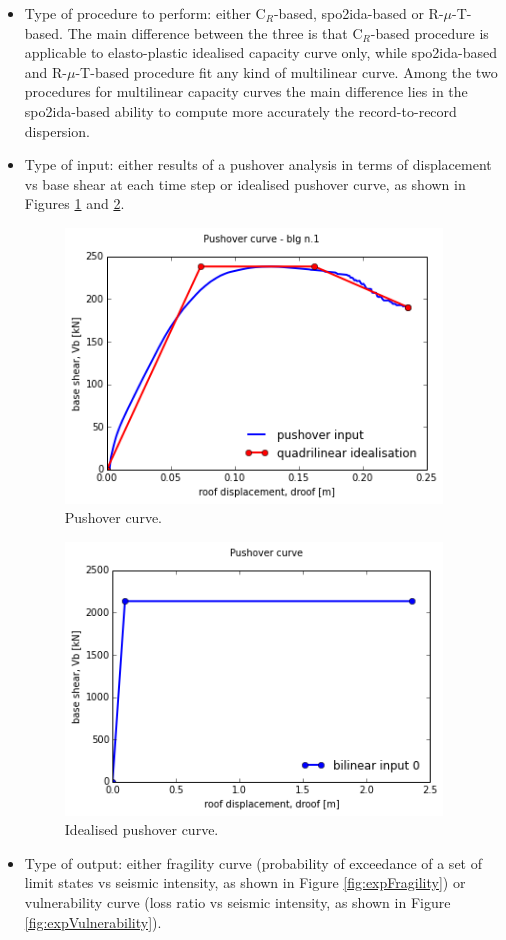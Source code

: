 \begin{itemize}
\item Type of procedure to perform: either C$_R$-based, spo2ida-based or R-$\mu$-T-based. The main difference between the three is that C$_R$-based procedure is applicable to elasto-plastic idealised capacity curve only, while spo2ida-based and R-$\mu$-T-based procedure fit any kind of multilinear curve. Among the two procedures for multilinear capacity curves the main difference lies in the spo2ida-based ability to compute more accurately the record-to-record dispersion. 
\item Type of input: either results of a pushover analysis in terms of displacement vs base shear at each time step or idealised pushover curve, as shown in Figures \ref{fig:expPushover} and \ref{fig:expIdealised}.

\begin{figure}[!htbp]
\centering
\includegraphics[width=10cm]{./figures/PushoverCurve.png}
\caption{Pushover curve.}
\label{fig:expPushover}
\end{figure}

\begin{figure}[!htbp]
\centering
\includegraphics[width=10cm]{./figures/IdealisedCurve.png}
\caption{Idealised pushover curve.}
\label{fig:expIdealised}
\end{figure}

\item Type of output: either fragility curve (probability of exceedance of a set of limit states vs seismic intensity, as shown in Figure \ref{fig:expFragility}) or vulnerability curve (loss ratio vs seismic intensity, as shown in Figure \ref{fig:expVulnerability}).
\end{itemize}

